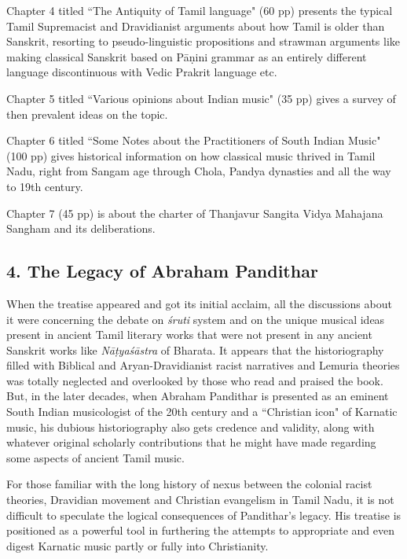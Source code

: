 Chapter 4 titled ``The Antiquity of Tamil language" (60 pp) presents the typical Tamil Supremacist and Dravidianist arguments about how Tamil is older than Sanskrit, resorting to pseudo-linguistic propositions and strawman arguments like making classical Sanskrit based on Pāṇini grammar as an entirely different language discontinuous with Vedic Prakrit language etc.

Chapter 5 titled ``Various opinions about Indian music" (35 pp) gives a survey of then prevalent ideas on the topic.

Chapter 6 titled ``Some Notes about the Practitioners of South Indian Music" (100 pp) gives historical information on how classical music thrived in Tamil Nadu, right from Sangam age through Chola, Pandya dynasties and all the way to 19th century.

Chapter 7 (45 pp) is about the charter of Thanjavur Sangita Vidya Mahajana Sangham and its deliberations.


\subsection*{4. The Legacy of Abraham Pandithar}

When the treatise appeared and got its initial acclaim, all the discussions about it were concerning the debate on \textit{śruti} system and on the unique musical ideas present in ancient Tamil literary works that were not present in any ancient Sanskrit works like \textit{Nāṭ­yaśāstra} of Bharata. It appears that the historiography filled with Biblical and Aryan-Dravidianist racist narratives and Lemuria theories was totally neglected and overlooked by those who read and praised the book. But, in the later decades, when Abraham Pandithar is presented as an eminent South Indian musicologist of the 20th century and a ``Christian icon" of Karnatic music, his dubious historiography also gets credence and validity, along with whatever original scholarly contributions that he might have made regarding some aspects of ancient Tamil music.

For those familiar with the long history of nexus between the colonial racist theories, Dravidian movement and Christian evangelism in Tamil Nadu, it is not difficult to speculate the logical consequences of Pandithar's legacy. His treatise is positioned as a powerful tool in furthering the attempts to appropriate and even digest Karnatic music partly or fully into Christianity.

